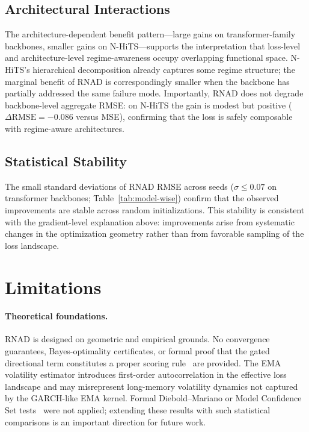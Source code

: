 \documentclass[11pt]{article}
\newcommand{\RNAD}{RNAD\xspace}
\begin{document}
\subsection{Architectural Interactions}
\label{ssec:interactions}

The architecture-dependent benefit pattern---large gains on
transformer-family backbones, smaller gains on N-HiTS---supports the
interpretation that loss-level and architecture-level regime-awareness
occupy overlapping functional space. N-HiTS's hierarchical
decomposition already captures some regime structure; the marginal
benefit of \RNAD is correspondingly smaller when the backbone has
partially addressed the same failure mode. Importantly, \RNAD does
not degrade backbone-level aggregate RMSE: on N-HiTS the gain is
modest but positive ($\Delta\mathrm{RMSE} = -0.086$ versus MSE),
confirming that the loss is safely composable with regime-aware
architectures.

\subsection{Statistical Stability}

The small standard deviations of \RNAD RMSE across seeds
($\sigma \leq 0.07$ on transformer backbones; Table~\ref{tab:model-wise})
confirm that the observed improvements are stable across random
initializations. This stability is consistent with the gradient-level
explanation above: improvements arise from systematic changes in the
optimization geometry rather than from favorable sampling of the
loss landscape.

\FloatBarrier
\section{Limitations}
\label{sec:limitations}

\paragraph{Theoretical foundations.}
\RNAD is designed on geometric and empirical grounds. No convergence
guarantees, Bayes-optimality certificates, or formal proof that the
gated directional term constitutes a proper scoring
rule~\citep{gneiting2007strictly} are provided. The EMA volatility
estimator introduces first-order autocorrelation in the effective loss
landscape and may misrepresent long-memory volatility dynamics not
captured by the GARCH-like EMA kernel. Formal Diebold--Mariano or
Model Confidence Set tests~\citep{diebold1995comparing,
hansen2011model} were not applied; extending these results with such
statistical comparisons is an important direction for future work.
\end{document}
